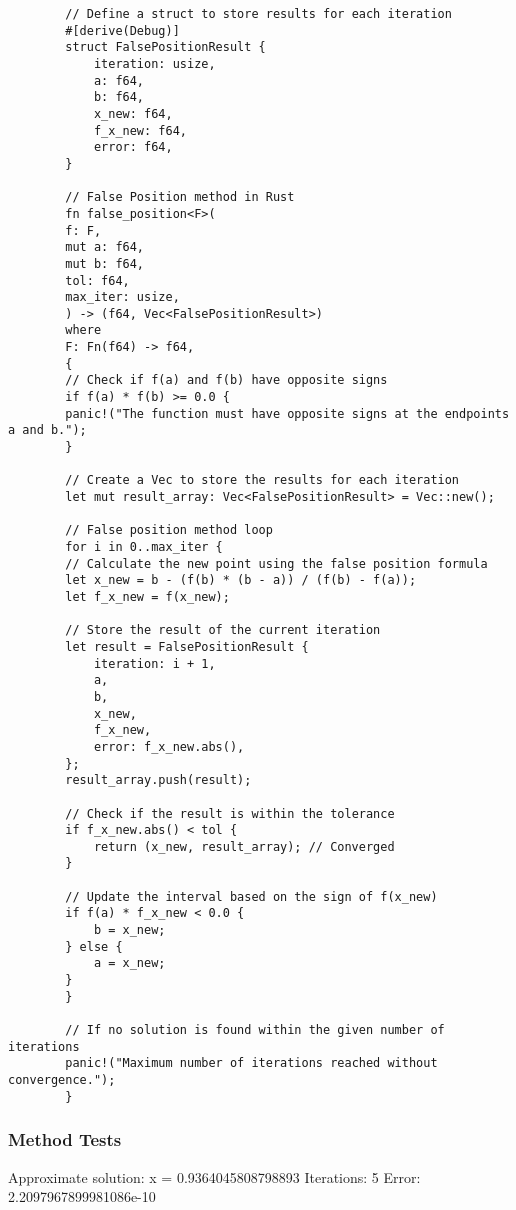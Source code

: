 \documentclass{article}
\begin{document}
    \begin{verbatim}
        // Define a struct to store results for each iteration
        #[derive(Debug)]
        struct FalsePositionResult {
            iteration: usize,
            a: f64,
            b: f64,
            x_new: f64,
            f_x_new: f64,
            error: f64,
        }

        // False Position method in Rust
        fn false_position<F>(
        f: F,
        mut a: f64,
        mut b: f64,
        tol: f64,
        max_iter: usize,
        ) -> (f64, Vec<FalsePositionResult>)
        where
        F: Fn(f64) -> f64,
        {
        // Check if f(a) and f(b) have opposite signs
        if f(a) * f(b) >= 0.0 {
        panic!("The function must have opposite signs at the endpoints a and b.");
        }

        // Create a Vec to store the results for each iteration
        let mut result_array: Vec<FalsePositionResult> = Vec::new();

        // False position method loop
        for i in 0..max_iter {
        // Calculate the new point using the false position formula
        let x_new = b - (f(b) * (b - a)) / (f(b) - f(a));
        let f_x_new = f(x_new);

        // Store the result of the current iteration
        let result = FalsePositionResult {
            iteration: i + 1,
            a,
            b,
            x_new,
            f_x_new,
            error: f_x_new.abs(),
        };
        result_array.push(result);

        // Check if the result is within the tolerance
        if f_x_new.abs() < tol {
            return (x_new, result_array); // Converged
        }

        // Update the interval based on the sign of f(x_new)
        if f(a) * f_x_new < 0.0 {
            b = x_new;
        } else {
            a = x_new;
        }
        }

        // If no solution is found within the given number of iterations
        panic!("Maximum number of iterations reached without convergence.");
        }
     \end{verbatim}
    \subsubsection{Method Tests}

        Approximate solution:
            x = 0.9364045808798893
            Iterations: 5
            Error: 2.2097967899981086e-10
\end{document}
